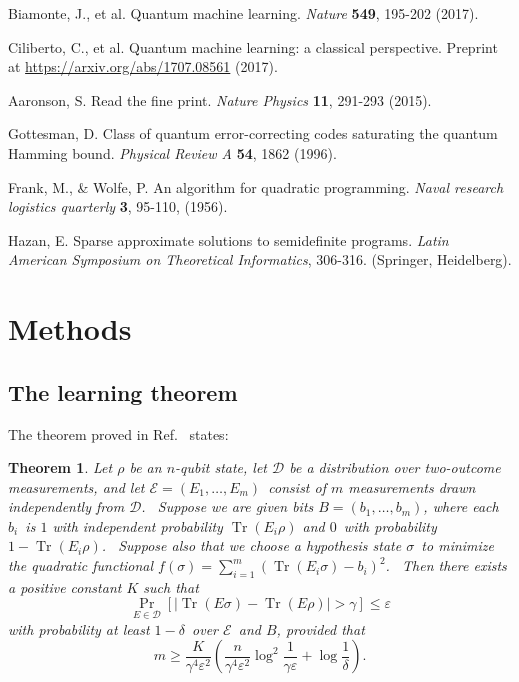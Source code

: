 \documentclass[aps,superscriptaddress,nofootinbib,twocolumn]{revtex4-1}
\newtheorem{theorem}{Theorem}
\begin{document}
\begin{thebibliography}{9}
 Biamonte, J., et al.
Quantum machine learning. \textit{Nature} \textbf{549}, 195-202 (2017).

 Ciliberto, C., et al.
Quantum machine learning: a classical perspective. Preprint at \href{https://arxiv.org/abs/1707.08561}{https://arxiv.org/abs/1707.08561} (2017).

 Aaronson, S.
Read the fine print. \textit{Nature Physics} \textbf{11}, 291-293 (2015).



 Gottesman, D. 
Class of quantum error-correcting codes saturating the quantum Hamming bound.
\textit{Physical Review A} \textbf{54}, 1862 (1996).


 Frank, M., \& Wolfe, P. 
An algorithm for quadratic programming. 
\textit{Naval research logistics quarterly} \textbf{3}, 95-110, (1956).

 Hazan, E.
Sparse approximate solutions to semidefinite programs. 
\textit{Latin American Symposium on Theoretical Informatics}, 306-316. (Springer, Heidelberg).

\end{thebibliography}

\clearpage

\section*{Methods}

\subsection*{The learning theorem}

The theorem proved in Ref.~\cite{aaronson2007learnability} states:

\begin{theorem}
\label{qoccam}
Let $\rho$ be an $n$-qubit state, let $\mathcal{D}$ be a
distribution over two-outcome measurements, and let $\mathcal{E}=\left(
E_{1},\ldots,E_{m}\right)  $\ consist of $m$ measurements drawn independently
from $\mathcal{D}$. \ Suppose we are given bits $B=\left(  b_1,\ldots
,b_m \right)  $, where each $b_i$\ is $1$ with independent probability
$\operatorname*{Tr}\left(  E_{i}\rho\right)  $ and $0$\ with probability
$1-\operatorname*{Tr}\left(  E_{i}\rho\right)  $. \ Suppose also that we
choose a hypothesis state $\sigma$\ to minimize the quadratic functional
$f(\sigma) = \sum_{i=1}^{m}\left(  \operatorname*{Tr}\left(  E_{i}\sigma\right)
-b_i \right)  ^{2}$. \ Then there exists a positive constant $K$ such that%
\[
\Pr_{E\in\mathcal{D}}\left[  \left\vert \operatorname*{Tr}\left(
E\sigma\right)  -\operatorname*{Tr}\left(  E\rho\right)  \right\vert
>\gamma\right]  \leq\varepsilon
\]
with probability at least $1-\delta$\ over $\mathcal{E}$\ and $B$, provided
that%
\[
m\geq\frac{K}{\gamma^{4}\varepsilon^{2}}\left(  \frac{n}{\gamma^{4}%
\varepsilon^{2}}\log^{2}\frac{1}{\gamma\varepsilon}+\log\frac{1}{\delta
}\right)  .
\]
\end{theorem}
\end{document}
